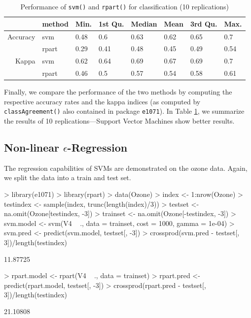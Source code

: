 \documentclass[a4paper]{article}
\newcommand{\pkg}[1]{\texttt{#1}}
\begin{document}

\begin{table}[ht]
\begin{center}
\begin{tabular}{rlllllll}
\hline
 & method & Min. & 1st Qu. & Median & Mean & 3rd Qu. & Max. \\
\hline
Accuracy &   svm & 0.48 &  0.6 & 0.63 & 0.62 & 0.65 &  0.7 \\
 & rpart & 0.29 & 0.41 & 0.48 & 0.45 & 0.49 & 0.54 \\
Kappa &   svm & 0.62 & 0.64 & 0.69 & 0.67 & 0.69 &  0.7 \\
  & rpart & 0.46 &  0.5 & 0.57 & 0.54 & 0.58 & 0.61 \\
\hline
\end{tabular}
\caption{Performance of \texttt{svm()} and
       \texttt{rpart()} for classification (10 replications)}
\label{tab:class}
\end{center}
\end{table}\noindent Finally, we compare the performance of the two methods by computing the 
respective accuracy rates and the kappa indices (as computed by \texttt{classAgreement()}
also contained in package \pkg{e1071}). In Table \ref{tab:class}, we
summarize the results of 10 replications---Support Vector Machines show better results.

\subsection*{Non-linear $\epsilon$-Regression}

The regression capabilities of SVMs are demonstrated on the
ozone data. Again, we split the data
into a train and test set.

\begin{Schunk}
\begin{Sinput}
> library(e1071)
> library(rpart)
> data(Ozone)
> index <- 1:nrow(Ozone)
> testindex <- sample(index, trunc(length(index)/3))
> testset <- na.omit(Ozone[testindex, -3])
> trainset <- na.omit(Ozone[-testindex, -3])
> svm.model <- svm(V4 ~ ., data = trainset, cost = 1000, gamma = 1e-04)
> svm.pred <- predict(svm.model, testset[, -3])
> crossprod(svm.pred - testset[, 3])/length(testindex)
\end{Sinput}
\begin{Soutput}
         [,1]
[1,] 11.87725
\end{Soutput}
\begin{Sinput}
> rpart.model <- rpart(V4 ~ ., data = trainset)
> rpart.pred <- predict(rpart.model, testset[, -3])
> crossprod(rpart.pred - testset[, 3])/length(testindex)
\end{Sinput}
\begin{Soutput}
         [,1]
[1,] 21.10808
\end{Soutput}
\end{Schunk}
\end{document}
